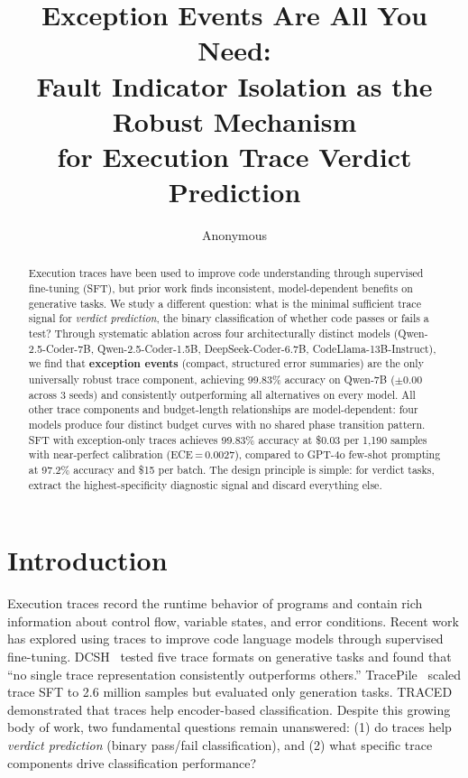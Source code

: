 \documentclass[11pt]{article}
\title{Exception Events Are All You Need:\\Fault Indicator Isolation as the Robust Mechanism\\for Execution Trace Verdict Prediction}
\author{Anonymous}
\date{}
\begin{document}
\maketitle

\begin{abstract}

Execution traces have been used to improve code understanding through supervised fine-tuning (SFT), but prior work finds inconsistent, model-dependent benefits on generative tasks. We study a different question: what is the minimal sufficient trace signal for \emph{verdict prediction}, the binary classification of whether code passes or fails a test? Through systematic ablation across four architecturally distinct models (Qwen-2.5-Coder-7B, Qwen-2.5-Coder-1.5B, DeepSeek-Coder-6.7B, CodeLlama-13B-Instruct), we find that \textbf{exception events} (compact, structured error summaries) are the only universally robust trace component, achieving 99.83\% accuracy on Qwen-7B ($\pm$0.00 across 3 seeds) and consistently outperforming all alternatives on every model. All other trace components and budget-length relationships are model-dependent: four models produce four distinct budget curves with no shared phase transition pattern. SFT with exception-only traces achieves 99.83\% accuracy at \$0.03 per 1{,}190 samples with near-perfect calibration (ECE\,=\,0.0027), compared to GPT-4o few-shot prompting at 97.2\% accuracy and \$15 per batch. The design principle is simple: for verdict tasks, extract the highest-specificity diagnostic signal and discard everything else.

\end{abstract}

\section{Introduction}
\label{sec:intro}

Execution traces record the runtime behavior of programs and contain rich information about control flow, variable states, and error conditions. Recent work has explored using traces to improve code language models through supervised fine-tuning. DCSH~\cite{dcsh2025} tested five trace formats on generative tasks and found that ``no single trace representation consistently outperforms others.'' TracePile~\cite{tracepile2025} scaled trace SFT to 2.6 million samples but evaluated only generation tasks. TRACED~\cite{traced2024} demonstrated that traces help encoder-based classification. Despite this growing body of work, two fundamental questions remain unanswered: (1) do traces help \emph{verdict prediction} (binary pass/fail classification), and (2) what specific trace components drive classification performance?
\end{document}
